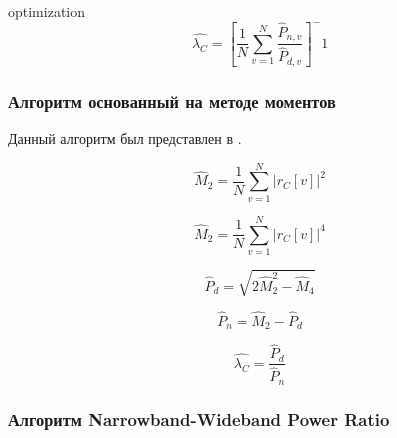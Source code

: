 \begin{center}optimization
\begin{equation}
	\hat{\lambda_C} = [ \frac{1}{N} \sum \limits_{v=1}^{N} \frac{\hat P_{n,v}}{\hat P_{d,v}} ]^-1
\end{equation}
\end{center}

\subsubsection{Алгоритм основанный на методе моментов}
\label{sssec:mm}

Данный алгоритм был представлен в \cite{snr_pauluzzi}.

\begin{center}
\begin{equation}
	\hat M_2 = \frac{1}{N} \sum \limits_{v=1}^{N} \left|r_C[v] \right| ^2
\end{equation}
\end{center}

\begin{center}
\begin{equation}
	\hat M_2 = \frac{1}{N} \sum \limits_{v=1}^{N} \left|r_C[v] \right| ^4
\end{equation}
\end{center}

\begin{center}
\begin{equation}
	\hat P_d = \sqrt{2 \hat M^2_2 - \hat M_4} 
\end{equation}
\end{center}

\begin{center}
\begin{equation}
	\hat P_n = \hat M_2 - \hat P_d
\end{equation}
\end{center}

\begin{center}
\begin{equation}
	\hat{\lambda_C} = \frac{\hat P_d}{\hat P_n}
\end{equation}
\end{center}

\subsubsection{Алгоритм Narrowband-Wideband Power Ratio}
\label{sssec:nwpr}

